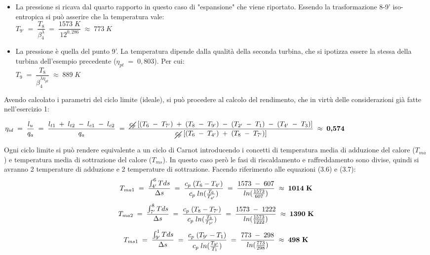 \documentclass[a4paper, twoside, 12pt]{report}
\begin{document}
\begin{itemize}
	\item[\textbf{Stato 9'}] La pressione si ricava dal quarto rapporto in questo caso di "espansione" che viene riportato. Essendo la trasformazione 8-9' iso-entropica si può asserire che la temperatura vale:\\
	$T_{9'}\;=\;\dfrac{T_{8}}{\beta_{4}^{\lambda}}\;=\;\dfrac{1573\;K}{12^{0,286}}\;\approx\;773\;K$
	\item[\textbf{Stato 9  }] La pressione è quella del punto 9'. La temperatura dipende dalla qualità della seconda turbina, che si ipotizza essere la stessa della turbina dell'esempio precedente ($\eta_{pt}\;=\;0,803$). Per cui:\\
	$T_{9}\;=\;\dfrac{T_{8}}{\beta_{4}^{\lambda\eta_{pt}}}\;\approx\;889\;K$
\end{itemize}
Avendo calcolato i parametri del ciclo limite (ideale), si può procedere al calcolo del rendimento, che in virtù delle considerazioni già fatte nell'esercizio 1:
\begin{center}
	$\eta_{id}\;=\;\dfrac{l_{u}}{q_{a}}\;=\;\dfrac{l_{t1}\;+\;l_{t2}\;-\;l_{c1}\;-\;l_{c2}}{q_{a}}\;=\;\dfrac{\cancel{c_{p}}\;[(T_{6}\;-\;T_{7'})\;+\;(T_{8}\;-\;T_{9'})\;-\;(T_{2'}\;-\;T_{1})\;-\;(T_{4'}\;-\;T_{3})]}{\cancel{c_{p}}\;[(T_{6}\;-\;T_{4'})\;+\;(T_{8}\;-\;T_{7'})]}\;\approx\;\textbf{0,574}$
\end{center}
Ogni ciclo limite si può rendere equivalente a un ciclo di Carnot introducendo i concetti di temperatura media di adduzione del calore ($T_{ma}$) e temperatura media di sottrazione del calore ($T_{ms}$). In questo caso però le fasi di riscaldamento e raffreddamento sono divise, quindi si avranno 2 temperature di adduzione e 2 temperature di sottrazione. Facendo riferimento alle equazioni (3.6) e (3.7):
\begin{equation}
	T_{ma1}\;=\;\dfrac{\int_{4'}^{6}Tds}{\Delta s}\;=\;\dfrac{c_{p}\;(T_{6}-T_{4'})}{c_{p}\;ln(\frac{T_{6}}{T_{4'}})}\;=\;\dfrac{1573\;-\;607}{ln(\frac{1573}{607})}\;\approx\;\textbf{1014\;K}
\end{equation}
\begin{equation}
	T_{ma2}\;=\;\dfrac{\int_{7'}^{8}Tds}{\Delta s}\;=\;\dfrac{c_{p}\;(T_{8}-T_{7'})}{c_{p}\;ln(\frac{T_{8}}{T_{7'}})}\;=\;\dfrac{1573\;-\;1222}{ln(\frac{1573}{1222})}\;\approx\;\textbf{1390\;K}
\end{equation}
\begin{equation}
	T_{ms1}\;=\;\dfrac{\int_{9'}^{1}Tds}{\Delta s}\;=\;\dfrac{c_{p}\;(T_{9'}-T_{1})}{c_{p}\;ln(\frac{T_{9'}}{T_{1}})}\;=\;\dfrac{773\;-\;298}{ln(\frac{773}{298})}\;\approx\;\textbf{498\;K}
\end{equation}
\end{document}
